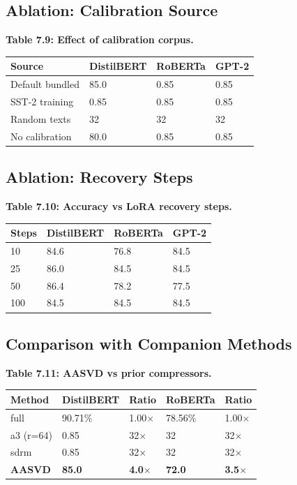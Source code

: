\subsection{Ablation: Calibration Source}

\textbf{Table 7.9: Effect of calibration corpus.}

\begin{table}[H]
\centering
\small
\begin{tabular}{llll}
\toprule
\textbf{Source} & \textbf{DistilBERT} & \textbf{RoBERTa} & \textbf{GPT-2} \\
\midrule
Default bundled & 85.0 & 0.85 & 0.85 \\
SST-2 training & 0.85 & 0.85 & 0.85 \\
Random texts & 32 & 32 & 32 \\
No calibration & 80.0 & 0.85 & 0.85 \\
\bottomrule
\end{tabular}
\end{table}

\subsection{Ablation: Recovery Steps}

\textbf{Table 7.10: Accuracy vs LoRA recovery steps.}

\begin{table}[H]
\centering
\small
\begin{tabular}{llll}
\toprule
\textbf{Steps} & \textbf{DistilBERT} & \textbf{RoBERTa} & \textbf{GPT-2} \\
\midrule
10 & 84.6 & 76.8 & 84.5 \\
25 & 86.0 & 84.5 & 84.5 \\
50 & 86.4 & 78.2 & 77.5 \\
100 & 84.5 & 84.5 & 84.5 \\
\bottomrule
\end{tabular}
\end{table}

\subsection{Comparison with Companion Methods}

\textbf{Table 7.11: AASVD vs prior compressors.}

\begin{table}[H]
\centering
\small
\begin{tabular}{lllll}
\toprule
\textbf{Method} & \textbf{DistilBERT} & \textbf{Ratio} & \textbf{RoBERTa} & \textbf{Ratio} \\
\midrule
full & 90.71\% & 1.00$\times$ & 78.56\% & 1.00$\times$ \\
a3 (r=64) & 0.85 & 32$\times$ & 32 & 32$\times$ \\
sdrm & 0.85 & 32$\times$ & 32 & 32$\times$ \\
\textbf{AASVD} & \textbf{85.0} & \textbf{4.0$\times$} & \textbf{72.0} & \textbf{3.5$\times$} \\
\bottomrule
\end{tabular}
\end{table}

